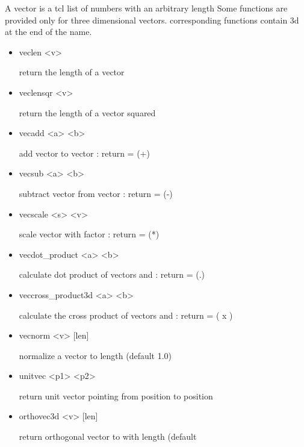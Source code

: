 \begin{itemize}
  A vector  is a tcl list of numbers with an arbitrary length
  Some functions are provided only for three dimensional vectors.
  corresponding functions contain 3d at the end of the name.
  \begin{itemize}
   \item
\begin{code}
veclen <v>
\end{code}
    return the length of a vector
   \item
\begin{code}
veclensqr <v>
\end{code}
    return the length of a vector squared
   \item
\begin{code}
vecadd <a> <b>
\end{code}
    add vector  to vector : return = (+)
   \item
\begin{code}
vecsub <a> <b>
\end{code}
    subtract vector  from vector : return = (-)
   \item
\begin{code}
vecscale <s> <v>
\end{code}
    scale vector  with factor : return = (*)
   \item
\begin{code}
vecdot\_product <a> <b>
\end{code}
    calculate dot product of vectors  and : return = (.)
   \item
\begin{code}
veccross\_product3d <a> <b>
\end{code}
calculate the cross product of vectors  and : return =
( x )
   \item
\begin{code}
vecnorm <v> [len]
\end{code}
    normalize a vector to length  (default 1.0)
   \item
\begin{code}
unitvec <p1> <p2>
\end{code}
    return unit vector pointing from position  to position 
   \item
\begin{code}
orthovec3d <v> [len]
\end{code}
return orthogonal vector to  with length  (default

\end{itemize}
\end{itemize}
